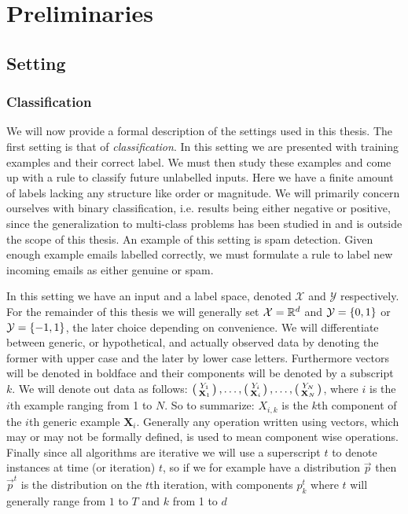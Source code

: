 
\chapter{Preliminaries}
\label{chap:prelim}
\section{Setting}
\subsection{Classification} 
\label{subsec:class}
We will now provide a formal description of the settings used in this thesis. The first setting is that of \textit{classification}\cite{Hastie2009}. In this setting we are presented with training examples and their correct label. We must then study these examples and come up with a rule to classify future unlabelled inputs. Here we have a finite amount of labels lacking any structure like order or magnitude. We will primarily concern ourselves with binary classification, i.e. results being either negative or positive, since the generalization to multi-class problems has been studied in \cite{Freund1997} and is outside the scope of this thesis. An example of this setting is spam detection. Given enough example emails labelled correctly, we must formulate a rule to label new incoming emails as either genuine or spam. 
\par In this setting we have an input and a label space, denoted $\mathcal X$ and $\mathcal Y$ respectively. For the remainder of this thesis we will generally set $\mathcal X = \R^d$ and $\mathcal Y = \set{0,1}$ or $\mathcal Y = \set{-1,1}$, the later choice depending on convenience. We will differentiate between generic, or hypothetical, and actually observed data by denoting the former with upper case  and the later by lower case letters. Furthermore vectors will be denoted in boldface and their components will be denoted by a subscript $k$. We will denote out data as follows: $\Vec{Y_1\\ \mathbf X_1},\ldots, \Vec{Y_i\\ \mathbf X_i},\ldots,\Vec{Y_N\\ \mathbf X_N}$, where $i$ is the $i$th example ranging from 1 to $N$. So to summarize: $X_{i,k}$ is the $k$th component of the $i$th generic example $\mathbf X_i$. Generally any operation written using vectors, which may or may not be formally defined, is used to mean component wise operations.  Finally since all algorithms are iterative we will use a superscript $t$ to denote instances at time (or iteration) $t$, so if we for example have a distribution $\vec p$ then $\vec p^t$ is the distribution on the $t$th iteration, with components $ p^t_k$ where $t$ will generally range from $1$ to $T$ and $k$ from 1 to $d$

